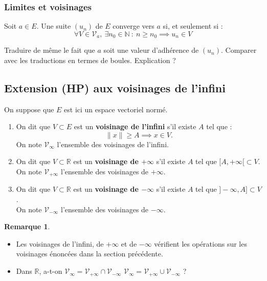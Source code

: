 \documentclass[french]{article}
\newcommand{\N}{\mathbb{N}}
\newcommand{\R}{\mathbb{R}}
\theoremstyle{plain}
\theoremstyle{definition}
\newtheorem*{rmq}{Remarque}
\theoremstyle{remark}
\begin{document}
\subsubsection*{Limites et voisinages}

\begin{prop}%
	Soit $a\in E$. Une suite $(u_n)$ de $E$ converge vers $a$ si, et seulement si : $$\forall V\in\mathcal{V}_a,\ \exists n_0\in\N\ : \ n\geqslant n_0\implies u_n\in V$$
\end{prop}

\begin{exo}
	Traduire de même le fait que $a$ soit une valeur d'adhérence de $(u_n)$. Comparer avec les traductions en termes de boules. Explication ?
\end{exo}

\subsection{Extension (HP) aux voisinages de l'infini}

On suppose que $E$ est ici un espace vectoriel normé.

\begin{dfn}
	\begin{enumerate}
		\item On dit que $V\subset E$ est un \textbf{voisinage de l'infini} s'il existe $A$ tel que : $$\lVert x\rVert\geqslant A\implies x\in V.$$
		On note $\mathcal{V}_\infty$ l'ensemble des voisinages de l'infini.
		\item On dit que $V\subset\R$ est un \textbf{voisinage de $+\infty$} s'il existe $A$ tel que $[A,+\infty[\subset V$. \\
		On note $\mathcal{V}_{+\infty}$ l'ensemble des voisinages de $+\infty$.
		\item On dit que $V\subset\R$ est un \textbf{voisinage de $-\infty$} s'il existe $A$ tel que $]-\infty,A]\subset V$. \\
		On note $\mathcal{V}_{-\infty}$ l'ensemble des voisinages de $-\infty$.
	\end{enumerate}
\end{dfn}

\begin{rmq}
	\begin{itemize}
		\item Les voisinages de l'infini, de $+\infty$ et de $-\infty$ vérifient les opérations sur les voisinages énoncées dans la section précédente.
		\item Dans $\R$, a-t-on $\mathcal{V}_\infty=\mathcal{V}_{+\infty}\cap\mathcal{V}_{-\infty}$ $\mathcal{V}_\infty=\mathcal{V}_{+\infty}\cup\mathcal{V}_{-\infty}$ ?
		\end{itemize}
\end{rmq}
\end{document}

